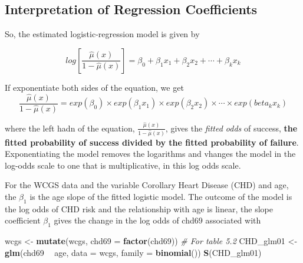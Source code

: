 \documentclass[
]{article}
\newenvironment{Shaded}{\begin{snugshade}}{\end{snugshade}}
\newcommand{\CommentTok}[1]{\textcolor[rgb]{0.56,0.35,0.01}{\textit{#1}}}
\newcommand{\DataTypeTok}[1]{\textcolor[rgb]{0.13,0.29,0.53}{#1}}
\newcommand{\KeywordTok}[1]{\textcolor[rgb]{0.13,0.29,0.53}{\textbf{#1}}}
\newcommand{\NormalTok}[1]{#1}
\newcommand{\OperatorTok}[1]{\textcolor[rgb]{0.81,0.36,0.00}{\textbf{#1}}}
\newcommand{\StringTok}[1]{\textcolor[rgb]{0.31,0.60,0.02}{#1}}
\begin{document}
\hypertarget{interpretation-of-regression-coefficients}{%
\subsection{Interpretation of Regression
Coefficients}\label{interpretation-of-regression-coefficients}}

So, the estimated logistic-regression model is given by

\[log[\frac{\hat\mu(x)}{1-\hat\mu(x)}] = \beta_0 + \beta_1 x_1 + \beta_2 x_2 + \cdots + \beta_k x_k\]

If exponentiate both sides of the equation, we get
\[\frac{\hat\mu(x)}{1-\hat\mu(x)} = exp(\beta_0) \times exp(\beta_1 x_1) \times exp(\beta_2 x_2) \times \cdots \times exp(beta_k x_k)\]

where the left hadn of the equation,
\(\frac{\hat\mu(x)}{1-\hat\mu(x)}\), gives the \emph{fitted odds} of
success, \textbf{the fitted probability of success divided by the fitted
probability of failure}. Exponentiating the model removes the logarithms
and vhanges the model in the log-odds scale to one that is
multiplicative, in this log odds scale.

For the WCGS data and the variable Corollary Heart Disease (CHD) and
age, the \(\beta_1\) is the age slope of the fitted logistic model. The
outcome of the model is the log odds of CHD risk and the relationship
with age is linear, the slope coefficient \(\beta_1\) gives the change
in the log odds of chd69 associated with

\begin{Shaded}
\begin{Highlighting}[]
\NormalTok{wcgs <-}\StringTok{ }\KeywordTok{mutate}\NormalTok{(wcgs, }\DataTypeTok{chd69 =} \KeywordTok{factor}\NormalTok{(chd69))}
\CommentTok{# For table 5.2}
\NormalTok{CHD_glm01 <-}\StringTok{ }\KeywordTok{glm}\NormalTok{(chd69 }\OperatorTok{~}\StringTok{ }\NormalTok{age, }\DataTypeTok{data =}\NormalTok{ wcgs, }\DataTypeTok{family =} \KeywordTok{binomial}\NormalTok{())}
\KeywordTok{S}\NormalTok{(CHD_glm01)}
\end{Highlighting}
\end{Shaded}
\end{document}
